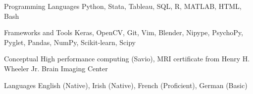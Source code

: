 

\begin{cvskills}

 \cvskill
  	{Programming Languages}
    {Python, Stata, Tableau, SQL, R, MATLAB, HTML, Bash} %
  
 \cvskill
   {Frameworks and Tools}
   {Keras, OpenCV, Git, Vim, Blender, Nipype, PsychoPy, Pyglet, Pandas, NumPy, Scikit-learn, Scipy}
   
 \cvskill
   {Conceptual}
   {High performance computing (Savio), MRI certificate from Henry H. Wheeler Jr. Brain Imaging Center}
   
  \cvskill
   {Languages}
   {English (Native), Irish (Native), French (Proficient), German (Basic)}
    

\end{cvskills}
